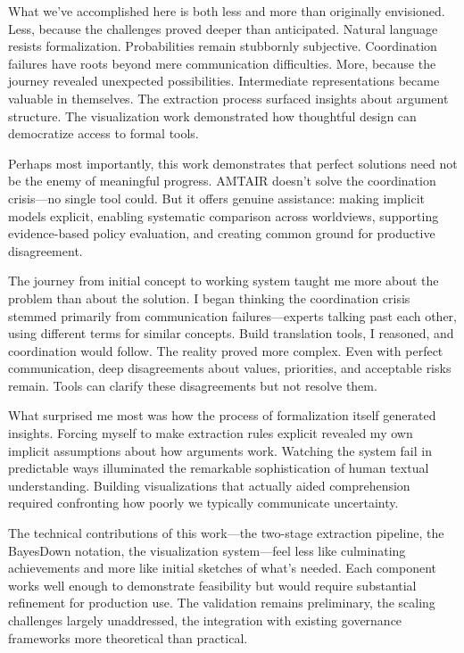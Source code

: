 \documentclass[
  11pt,
  letterpaper,
  openany]{book}
\begin{document}
What we've accomplished here is both less and more than originally
envisioned. Less, because the challenges proved deeper than anticipated.
Natural language resists formalization. Probabilities remain stubbornly
subjective. Coordination failures have roots beyond mere communication
difficulties. More, because the journey revealed unexpected
possibilities. Intermediate representations became valuable in
themselves. The extraction process surfaced insights about argument
structure. The visualization work demonstrated how thoughtful design can
democratize access to formal tools.

Perhaps most importantly, this work demonstrates that perfect solutions
need not be the enemy of meaningful progress. AMTAIR doesn't solve the
coordination crisis---no single tool could. But it offers genuine
assistance: making implicit models explicit, enabling systematic
comparison across worldviews, supporting evidence-based policy
evaluation, and creating common ground for productive disagreement.

The journey from initial concept to working system taught me more about
the problem than about the solution. I began thinking the coordination
crisis stemmed primarily from communication failures---experts talking
past each other, using different terms for similar concepts. Build
translation tools, I reasoned, and coordination would follow. The
reality proved more complex. Even with perfect communication, deep
disagreements about values, priorities, and acceptable risks remain.
Tools can clarify these disagreements but not resolve them.

What surprised me most was how the process of formalization itself
generated insights. Forcing myself to make extraction rules explicit
revealed my own implicit assumptions about how arguments work. Watching
the system fail in predictable ways illuminated the remarkable
sophistication of human textual understanding. Building visualizations
that actually aided comprehension required confronting how poorly we
typically communicate uncertainty.

The technical contributions of this work---the two-stage extraction
pipeline, the BayesDown notation, the visualization system---feel less
like culminating achievements and more like initial sketches of what's
needed. Each component works well enough to demonstrate feasibility but
would require substantial refinement for production use. The validation
remains preliminary, the scaling challenges largely unaddressed, the
integration with existing governance frameworks more theoretical than
practical.
\end{document}
